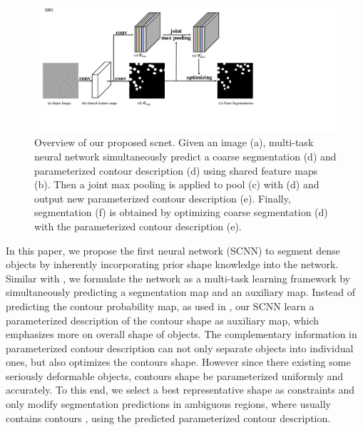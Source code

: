 \begin{figure}\label{FigSCNN}
\begin{center}
\includegraphics[width=6.8in]{figures/Fig2.pdf}
\end{center}
   \caption{Overview of our proposed scnet. Given an image (a), multi-task neural network simultaneously predict a coarse segmentation (d) and parameterized contour description (d) using shared feature maps (b).
   Then a joint max pooling is applied to pool (c) with (d) and output new parameterized contour description (e).
   Finally, segmentation (f) is obtained by optimizing coarse segmentation (d) with the parameterized contour description (e).}
\end{figure}

In this paper, we propose the first  neural network (SCNN) to segment dense objects by inherently incorporating prior shape knowledge into the network.
Similar with \cite{Chen2016a}, we formulate the network as a multi-task learning framework by simultaneously predicting a segmentation map and an auxiliary map.
Instead of predicting the contour probability map, as used in \cite{Chen2016a,Chen2016,Bertasius2016}, our SCNN learn a parameterized description of the contour shape as  auxiliary map, which emphasizes more on  overall shape of objects.
The complementary information in parameterized contour description can not only separate objects into individual ones, but also optimizes the contours shape.
%
However since there existing some seriously deformable objects, contours shape  be parameterized uniformly and accurately.
To this end, we select a best representative shape as constraints and only modify segmentation predictions in ambiguous regions, where usually contains contours , using the predicted parameterized contour description.

